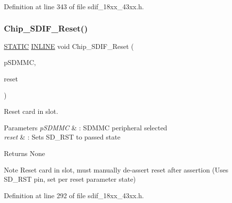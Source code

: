 Definition at line 343 of file sdif\+\_\+18xx\+\_\+43xx.\+h.

\mbox{\label{group___s_d_i_f__18_x_x__43_x_x_ga40411a54dae88b2b176c68c44846d709}} 
\subsubsection{\texorpdfstring{Chip\+\_\+\+S\+D\+I\+F\+\_\+\+Reset()}{Chip\_SDIF\_Reset()}}
{\footnotesize\ttfamily \hyperlink{group___l_p_c___types___public___macros_ga10b2d890d871e1489bb02b7e70d9bdfb}{S\+T\+A\+T\+IC} \hyperlink{spifi__18xx__43xx_8h_a2eb6f9e0395b47b8d5e3eeae4fe0c116}{I\+N\+L\+I\+NE} void Chip\+\_\+\+S\+D\+I\+F\+\_\+\+Reset (\begin{DoxyParamCaption}\item[{\hyperlink{struct_l_p_c___s_d_m_m_c___t}{L\+P\+C\+\_\+\+S\+D\+M\+M\+C\+\_\+T} $\ast$}]{p\+S\+D\+M\+MC,  }\item[{int32\+\_\+t}]{reset }\end{DoxyParamCaption})}



Reset card in slot. 


\begin{DoxyParams}{Parameters}
{\em p\+S\+D\+M\+MC} & \+: S\+D\+M\+MC peripheral selected \\
\hline
{\em reset} & \+: Sets S\+D\+\_\+\+R\+ST to passed state \\
\hline
\end{DoxyParams}
\begin{DoxyReturn}{Returns}
None 
\end{DoxyReturn}
\begin{DoxyNote}{Note}
Reset card in slot, must manually de-\/assert reset after assertion (Uses S\+D\+\_\+\+R\+ST pin, set per reset parameter state) 
\end{DoxyNote}


Definition at line 292 of file sdif\+\_\+18xx\+\_\+43xx.\+h.

\mbox{\label{group___s_d_i_f__18_x_x__43_x_x_ga4cee4237b975343d87b992cf4b90fed2}} 
